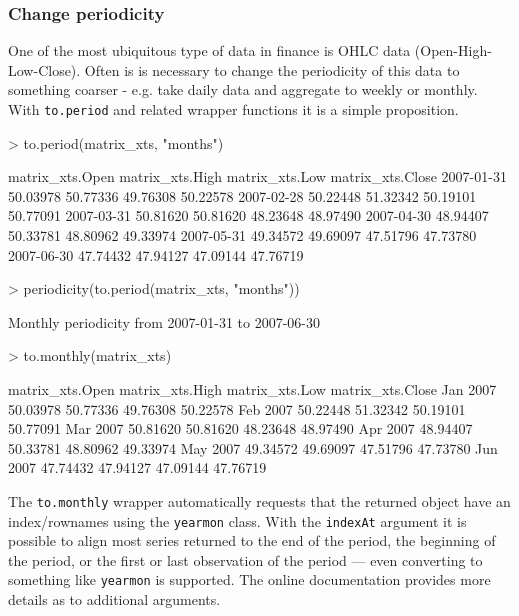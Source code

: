 \documentclass{article}
\begin{document}
\subsubsection*{Change periodicity}
One of the most ubiquitous type of data
in finance is OHLC data (Open-High-Low-Close). Often is is necessary
to change the periodicity of this data to something
coarser - e.g. take daily data and aggregate to weekly
or monthly.  With {\tt to.period} and related wrapper
functions it is a simple proposition.
\begin{Schunk}
\begin{Sinput}
> to.period(matrix_xts, "months")
\end{Sinput}
\begin{Soutput}
           matrix_xts.Open matrix_xts.High matrix_xts.Low matrix_xts.Close
2007-01-31        50.03978        50.77336       49.76308         50.22578
2007-02-28        50.22448        51.32342       50.19101         50.77091
2007-03-31        50.81620        50.81620       48.23648         48.97490
2007-04-30        48.94407        50.33781       48.80962         49.33974
2007-05-31        49.34572        49.69097       47.51796         47.73780
2007-06-30        47.74432        47.94127       47.09144         47.76719
\end{Soutput}
\begin{Sinput}
> periodicity(to.period(matrix_xts, "months"))
\end{Sinput}
\begin{Soutput}
Monthly periodicity from 2007-01-31 to 2007-06-30 
\end{Soutput}
\begin{Sinput}
> to.monthly(matrix_xts)
\end{Sinput}
\begin{Soutput}
         matrix_xts.Open matrix_xts.High matrix_xts.Low matrix_xts.Close
Jan 2007        50.03978        50.77336       49.76308         50.22578
Feb 2007        50.22448        51.32342       50.19101         50.77091
Mar 2007        50.81620        50.81620       48.23648         48.97490
Apr 2007        48.94407        50.33781       48.80962         49.33974
May 2007        49.34572        49.69097       47.51796         47.73780
Jun 2007        47.74432        47.94127       47.09144         47.76719
\end{Soutput}
\end{Schunk}
The {\tt to.monthly} wrapper automatically requests that the
returned object have an index/rownames using
the {\tt yearmon} class. With the {\tt indexAt}
argument it is possible to align most series
returned to the end of the period, the beginning of the period,
or the first or last observation of the period --- 
even converting to something like {\tt yearmon} is supported.  The online
documentation provides more details as to additional
arguments.
\end{document}
